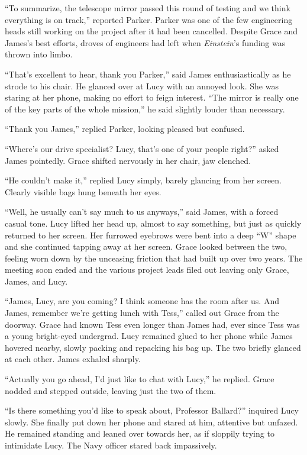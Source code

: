 \documentclass[12pt]{article} %
\begin{document}
``To summarize, the telescope mirror passed this round of testing and we think everything is on track,'' reported Parker. Parker was one of the few engineering heads still working on the project after it had been cancelled. Despite Grace and James's best efforts, droves of engineers had left when \textit{Einstein}'s funding was thrown into limbo.

``That's excellent to hear, thank you Parker,'' said James enthusiastically as he strode to his chair. He glanced over at Lucy with an annoyed look. She was staring at her phone, making no effort to feign interest. ``The mirror is really one of the key parts of the whole mission,'' he said slightly louder than necessary.

``Thank you James,'' replied Parker, looking pleased but confused.

``Where's our drive specialist? Lucy, that's one of your people right?'' asked James pointedly. Grace shifted nervously in her chair, jaw clenched.

``He couldn't make it,'' replied Lucy simply, barely glancing from her screen. Clearly visible bags hung beneath her eyes.

``Well, he usually can't say much to us anyways,'' said James, with a forced casual tone. Lucy lifted her head up, almost to say something, but just as quickly returned to her screen. Her furrowed eyebrows were bent into a deep ``W'' shape and she continued tapping away at her screen. Grace looked between the two, feeling worn down by the unceasing friction that had built up over two years. The meeting soon ended and the various project leads filed out leaving only Grace, James, and Lucy.

``James, Lucy, are you coming? I think someone has the room after us. And James, remember we're getting lunch with Tess,'' called out Grace from the doorway. Grace had known Tess even longer than James had, ever since Tess was a young bright-eyed undergrad. Lucy remained glued to her phone while James hovered nearby, slowly packing and repacking his bag up. The two briefly glanced at each other. James exhaled sharply.

``Actually you go ahead, I'd just like to chat with Lucy,'' he replied. Grace nodded and stepped outside, leaving just the two of them.

``Is there something you'd like to speak about, Professor Ballard?'' inquired Lucy slowly. She finally put down her phone and stared at him, attentive but unfazed. He remained standing and leaned over towards her, as if sloppily trying to intimidate Lucy. The Navy officer stared back impassively.
\end{document}
